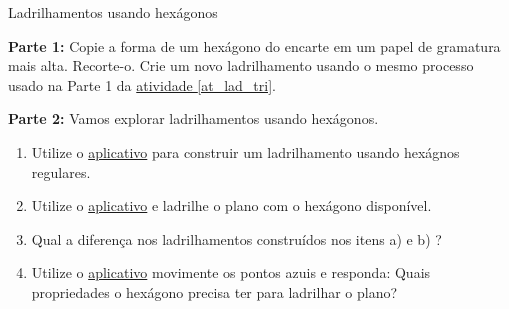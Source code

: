 \begin{task}{Ladrilhamentos usando hexágonos} \label{lad_hex}

\textbf{Parte 1:} Copie a forma de  um hexágono do encarte em um papel de gramatura mais alta. Recorte-o. Crie um novo ladrilhamento usando o mesmo processo usado na Parte 1 da \hyperref[at_lad_tri]{atividade \ref{at_lad_tri}}. 

\textbf{Parte 2:} Vamos explorar  ladrilhamentos  usando  hexágonos. 
\begin{enumerate}

\item Utilize o  \href{https://www.geogebra.org/m/uqemfkhp#material/zfczbshq}{aplicativo} para construir um ladrilhamento usando hexágnos regulares.
\item Utilize o  \href{https://www.geogebra.org/m/uqemfkhp#material/pnhc6tep}{aplicativo} e ladrilhe o plano com o hexágono disponível.
\item Qual a diferença nos ladrilhamentos construídos nos itens a) e b) ?

\item Utilize o \href{https://www.geogebra.org/m/uqemfkhp#material/ub84tqyy}{aplicativo} movimente os pontos azuis e responda: Quais propriedades o hexágono precisa ter para ladrilhar o plano?

\end{enumerate}
\end{task}




